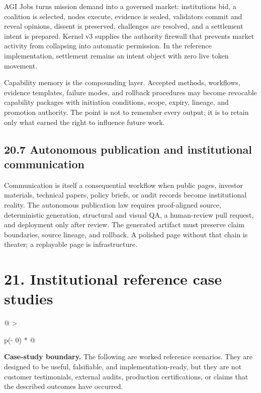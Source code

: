 AGI Jobs turns mission demand into a governed market: institutions bid,
a coalition is selected, nodes execute, evidence is sealed, validators
commit and reveal opinions, dissent is preserved, challenges are
resolved, and a settlement intent is prepared. Kernel v3 supplies the
authority firewall that prevents market activity from collapsing into
automatic permission. In the reference implementation, settlement
remains an intent object with zero live token movement.

Capability memory is the compounding layer. Accepted methods, workflows,
evidence templates, failure modes, and rollback procedures may become
revocable capability packages with initiation conditions, scope, expiry,
lineage, and promotion authority. The point is not to remember every
output; it is to retain only what earned the right to influence future
work.

\subsection{20.7 Autonomous publication and institutional
communication}\label{autonomous-publication-and-institutional-communication}

Communication is itself a consequential workflow when public pages,
investor materials, technical papers, policy briefs, or audit records
become institutional reality. The autonomous publication law requires
proof-aligned source, deterministic generation, structural and visual
QA, a human-review pull request, and deployment only after review. The
generated artifact must preserve claim boundaries, source lineage, and
rollback. A polished page without that chain is theater; a replayable
page is infrastructure.

\section{21. Institutional reference case
studies}\label{institutional-reference-case-studies}

\begin{longtable}[]{@{}
  >{\raggedright\arraybackslash}p{(\columnwidth - 0\tabcolsep) * }@{}}
\toprule\noalign{}
\begin{minipage}[b]{\linewidth}\raggedright
\textbf{Case-study boundary.} The following are worked reference
scenarios. They are designed to be useful, falsifiable, and
implementation-ready, but they are not customer testimonials, external
audits, production certifications, or claims that the described outcomes
have occurred.
\end{minipage} \\
\midrule\noalign{}
\endhead
\bottomrule\noalign{}
\endlastfoot
\end{longtable}

